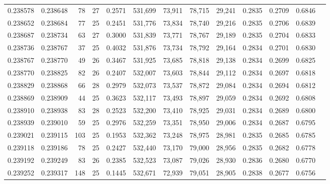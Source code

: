 \begin{tabular}{rrrrrrrrrrrrr}
0.238578 & 0.238648 &  78 &  27 &                                     0.2571 & 531,699 &  73,911 &  78,715 &  29,241 & 0.2835 & 0.2709 & 0.6846 \\
0.238652 & 0.238684 &  77 &  25 &                                     0.2451 & 531,776 &  73,834 &  78,740 &  29,216 & 0.2835 & 0.2706 & 0.6839 \\
0.238687 & 0.238734 &  63 &  27 &                                     0.3000 & 531,839 &  73,771 &  78,767 &  29,189 & 0.2835 & 0.2704 & 0.6833 \\
0.238736 & 0.238767 &  37 &  25 &                                     0.4032 & 531,876 &  73,734 &  78,792 &  29,164 & 0.2834 & 0.2701 & 0.6830 \\
0.238767 & 0.238770 &  49 &  26 &                                     0.3467 & 531,925 &  73,685 &  78,818 &  29,138 & 0.2834 & 0.2699 & 0.6825 \\
0.238770 & 0.238825 &  82 &  26 &                                     0.2407 & 532,007 &  73,603 &  78,844 &  29,112 & 0.2834 & 0.2697 & 0.6818 \\
0.238829 & 0.238868 &  66 &  28 &                                     0.2979 & 532,073 &  73,537 &  78,872 &  29,084 & 0.2834 & 0.2694 & 0.6812 \\
0.238869 & 0.238909 &  44 &  25 &                                     0.3623 & 532,117 &  73,493 &  78,897 &  29,059 & 0.2834 & 0.2692 & 0.6808 \\
0.238910 & 0.238938 &  83 &  28 &                                     0.2523 & 532,200 &  73,410 &  78,925 &  29,031 & 0.2834 & 0.2689 & 0.6800 \\
0.238939 & 0.239010 &  59 &  25 &                                     0.2976 & 532,259 &  73,351 &  78,950 &  29,006 & 0.2834 & 0.2687 & 0.6795 \\
0.239021 & 0.239115 & 103 &  25 &                                     0.1953 & 532,362 &  73,248 &  78,975 &  28,981 & 0.2835 & 0.2685 & 0.6785 \\
0.239118 & 0.239186 &  78 &  25 &                                     0.2427 & 532,440 &  73,170 &  79,000 &  28,956 & 0.2835 & 0.2682 & 0.6778 \\
0.239192 & 0.239249 &  83 &  26 &                                     0.2385 & 532,523 &  73,087 &  79,026 &  28,930 & 0.2836 & 0.2680 & 0.6770 \\
0.239252 & 0.239317 & 148 &  25 &                                     0.1445 & 532,671 &  72,939 &  79,051 &  28,905 & 0.2838 & 0.2677 & 0.6756 \\

\end{tabular}
